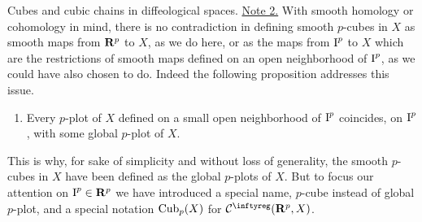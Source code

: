 \begin{Article}{Cubes and cubic chains in diffeological spaces.}{}
  \uline{Note 2.} With smooth homology or cohomology in mind,
  there is no contradiction in defining smooth $p$-cubes in $X$ as smooth maps from $\mathbf{R}^p$ to $X$,
  as we do here,
  or as the maps from $\operatorname{I}^{p}$ to $X$ which are the restrictions of smooth maps defined on an open neighborhood of $\operatorname{I}^{p}$,
  as we could have also chosen to do.
  Indeed the following proposition addresses this issue.

  \begin{enumerate}
    \item[($\diamondsuit$)] Every $p$-plot of $X$ defined on a small open neighborhood of $\operatorname{I}^{p}$ coincides,
    on $\operatorname{I}^{p}$,
    with some global $p$-plot of $X$.
  \end{enumerate}

  This is why,
  for sake of simplicity and without loss of generality,
  the smooth $p$-cubes in $X$ have been defined as the global $p$-plots of $X$.
  But to focus our attention on $\operatorname{I}^{p} \in \mathbf{R}^p$ we have introduced a special name,
  $p$-cube instead of global $p$-plot,
  and a special notation $\operatorname{Cub}_{p}(X)$ for $\Cinfty(\RR^p,X)$.
\end{Article}

